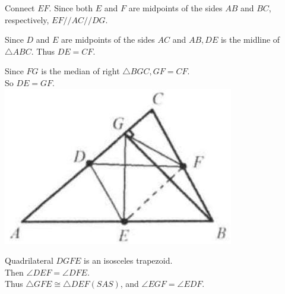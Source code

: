 \documentclass{article}
\begin{document}
Connect \(E F\). Since both \(E\) and \(F\) are midpoints of the sides \(A B\) and \(B C\), respectively, \(E F / / A C / / D G\).

Since \(D\) and \(E\) are midpoints of the sides \(A C\) and \(A B, D E\) is the midline of \(\triangle A B C\). Thus \(D E=C F\).

Since \(F G\) is the median of right \(\triangle B G C, G F=C F\).\\
So \(D E=G F\).\\
\centering
\includegraphics[width=\textwidth]{images/050(2).jpg}

Quadrilateral \(D G F E\) is an isosceles trapezoid.\\
Then \(\angle D E F=\angle D F E\).\\
Thus \(\triangle G F E \cong \triangle D E F(S A S)\), and \(\angle E G F=\angle E D F\).
\end{document}
